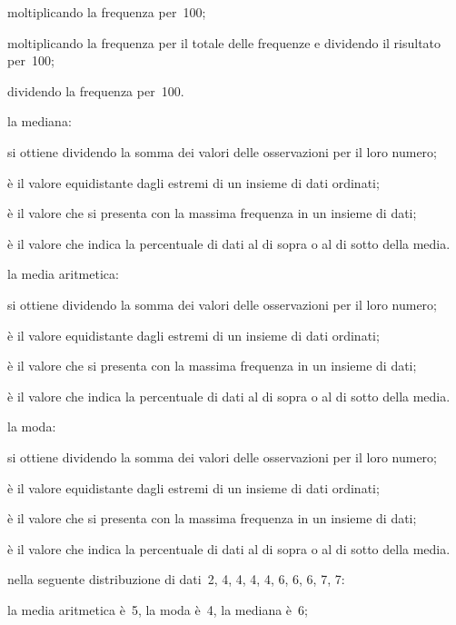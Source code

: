\begin{esercizio}
\begin{enumerate*}
\begin{enumeratea}
\item moltiplicando la frequenza per~100;
\item moltiplicando la frequenza per il totale delle frequenze e dividendo 
il risultato per~100;
\item dividendo la frequenza per~100.
 \end{enumeratea}
\item la mediana:
 \begin{enumeratea}
\item si ottiene dividendo la somma dei valori delle osservazioni per il loro 
numero;
\item è il valore equidistante dagli estremi di un insieme di dati ordinati;
\item è il valore che si presenta con la massima frequenza in un insieme di 
dati;
\item è il valore che indica la percentuale di dati al di sopra o al di 
sotto della media.
 \end{enumeratea}
\item la media aritmetica:
 \begin{enumeratea}
 \item si ottiene dividendo la somma dei valori delle osservazioni per il loro 
numero;
\item è il valore equidistante dagli estremi di un insieme di dati ordinati;
\item è il valore che si presenta con la massima frequenza in un insieme di 
dati;
\item è il valore che indica la percentuale di dati al di sopra o al di 
sotto della media.
 \end{enumeratea}
\item la moda:
 \begin{enumeratea}
\item si ottiene dividendo la somma dei valori delle osservazioni per il loro 
numero;
\item è il valore equidistante dagli estremi di un insieme di dati ordinati;
\item è il valore che si presenta con la massima frequenza in un insieme di 
dati;
\item è il valore che indica la percentuale di dati al di sopra o al di 
sotto della media.
 \end{enumeratea}
\item nella seguente distribuzione di dati~2, 4, 4, 4, 4, 6, 6, 6, 7, 7:
 \begin{enumeratea}
\item la media aritmetica è~5, la moda è~4, la mediana è~6;

\end{enumeratea}
\end{enumerate*}
\end{esercizio}

